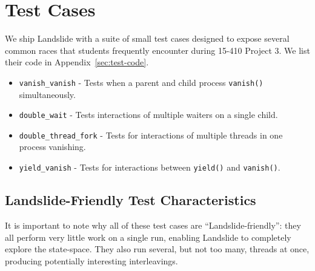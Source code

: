 \section{Test Cases}
\label{sec:using-tests}

We ship Landslide with a suite of small test cases designed to expose several common races that students frequently encounter during 15-410 Project 3. We list their code in Appendix~\ref{sec:test-code}.

\begin{itemize}
        \item \texttt{vanish\_vanish} - Tests when a parent and child process \texttt{vanish()} simultaneously.
        \item \texttt{double\_wait} - Tests interactions of multiple waiters on a single child.
        \item \texttt{double\_thread\_fork} - Tests for interactions of multiple threads in one process vanishing.
        \item \texttt{yield\_vanish} - Tests for interactions between \texttt{yield()} and \texttt{vanish()}.
\end{itemize}

\subsection{Landslide-Friendly Test Characteristics}
\label{sec:using-landslide-friendly-tests}

It is important to note why all of these test cases are ``Landslide-friendly'': they all perform very little work on a single run, enabling Landslide to completely explore the state-space. They also run several, but not too many, threads at once, producing potentially interesting interleavings.
